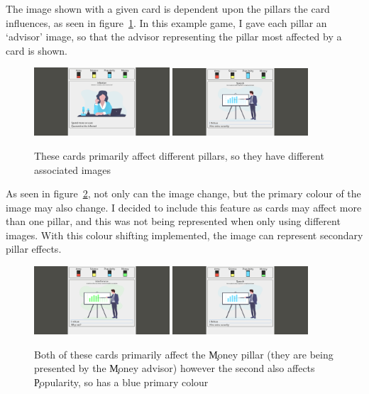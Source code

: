 The image shown with a given card is dependent upon the pillars the card influences, as seen in figure~\ref{fig:advisor_comp}. In this example game, I gave each pillar an `advisor' image, so that the advisor representing the pillar most affected by a card is shown.

\begin{figure}[!h]
	\centering
	\includegraphics[width=0.45\textwidth]{./images/design/game.png}
	\includegraphics[width=0.45\textwidth]{./images/design/ecman_blue.png}
	\caption{These cards primarily affect different pillars, so they have different associated images}
	\label{fig:advisor_comp}
\end{figure}

As seen in figure~\ref{fig:colour_comp}, not only can the image change, but the primary colour of the image may also change. I decided to include this feature as cards may affect more than one pillar, and this was not being represented when only using different images. With this colour shifting implemented, the image can represent secondary pillar effects.

\begin{figure}[!h]
	\centering
	\includegraphics[width=0.45\textwidth]{./images/design/ecman_green.png}
	\includegraphics[width=0.45\textwidth]{./images/design/ecman_blue.png}
	\caption{Both of these cards primarily affect the \c{Money} pillar (they are being presented by the \c{Money} advisor) however the second also affects \c{Popularity}, so has a blue primary colour}
	\label{fig:colour_comp}
\end{figure}

